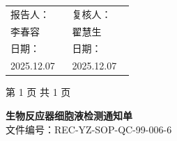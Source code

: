 \documentclass[UTF8,10pt,a4paper,fontset=fandol]{ctexart}
\newcommand{\fieldvalue}[1]{#1}
\newcommand{\handwritten}[1]{#1}
\begin{document}
\vspace{1em}

\begin{tabular}{p{0.44\linewidth}p{0.44\linewidth}}
报告人：&
复核人：\\[4pt]
\fieldvalue{\handwritten{李春容}}&
\fieldvalue{\handwritten{翟慧生}}\\[8pt]
日期：&
日期：\\[4pt]
\fieldvalue{\handwritten{2025.12.07}}&
\fieldvalue{\handwritten{2025.12.07}}
\end{tabular}

\vfill
\begin{center}
第 1 页 共 1 页
\end{center}

\newpage

\begin{center}
{\Large \textbf{生物反应器细胞液检测通知单}}\\[0.5em]
文件编号：REC-YZ-SOP-QC-99-006-6
\end{center}
\end{document}

